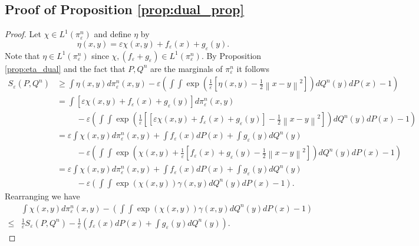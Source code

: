 \documentclass{article}
\theoremstyle{definition}
\newcommand{\feps}{f_\varepsilon}
\newcommand{\geps}{g_\varepsilon}
\newcommand{\norm}[1]{\left\lVert#1\right\rVert}
\begin{document}
\subsection{Proof of Proposition \ref{prop:dual_prop}}
\begin{proof}
    Let $\chi \in L^1(\pi_\varepsilon^n)$ and define $\eta$ by 
    \begin{equation*}
        \eta(x,y) = \varepsilon\chi(x,y) + \feps(x) + \geps(y).
    \end{equation*}
    Note that $\eta \in L^1(\pi_\varepsilon^n)$ since $\chi, (\feps + \geps) \in L^1(\pi_\varepsilon^n)$. By Proposition \ref{prop:eta_dual} and the fact that $P,Q^n$ are the marginals of $\pi_\varepsilon^n$ it follows
    \begin{align*}
        S_\varepsilon(P,Q^n) &\geq \int \eta(x,y) d\pi_\varepsilon^n(x,y) - \varepsilon \left ( \int \int \exp\left ( \frac{1}{\varepsilon}\left [\eta(x,y) - \frac{1}{2}\norm{x-y}^2 \right ] \right ) dQ^n(y)dP(x) - 1 \right ) \\
        &= \int \left [ \varepsilon\chi(x,y) + \feps(x) + \geps(y) \right ] d\pi_\varepsilon^n(x,y) \nonumber \\
        &\hspace{1cm}- \varepsilon \left ( \int \int \exp\left ( \frac{1}{\varepsilon}\left [\left[\varepsilon\chi(x,y) + \feps(x) + \geps(y)\right ] - \frac{1}{2}\norm{x-y}^2 \right ] \right ) dQ^n(y)dP(x) - 1 \right ) \\
        &= \varepsilon \int \chi(x,y) d\pi_\varepsilon^n(x,y) + \int \feps(x) dP(x) + \int \geps(y) dQ^n(y) \nonumber \\
        &\hspace{1cm} - \varepsilon \left ( \int \int \exp\left (\chi(x,y) + \frac{1}{\varepsilon}\left[\feps(x) + \geps(y) - \frac{1}{2}\norm{x-y}^2\right ] \right ) dQ^n(y)dP(x) - 1 \right ) \\
        &= \varepsilon \int \chi(x,y) d\pi_\varepsilon^n(x,y) + \int \feps(x) dP(x) + \int \geps(y) dQ^n(y) \nonumber \\
        &\hspace{1cm} - \varepsilon \left ( \int \int \exp(\chi(x,y))\gamma(x,y) dQ^n(y)dP(x) - 1 \right ).
    \end{align*}
    Rearranging we have 
    \begin{align}
        &\int \chi(x,y) d\pi_\varepsilon^n(x,y) - \left ( \int  \int \exp(\chi(x,y))\gamma(x,y) dQ^n(y)dP(x) - 1 \right ) \nonumber  \\
        \leq &\frac{1}{\varepsilon} S_\varepsilon(P,Q^n) - \frac{1}{\varepsilon} \left ( \feps(x) dP(x) + \int \geps(y) dQ^n(y) \right ). \label{eq:chi_bound_1}

\end{align}
\end{proof}
\end{document}
